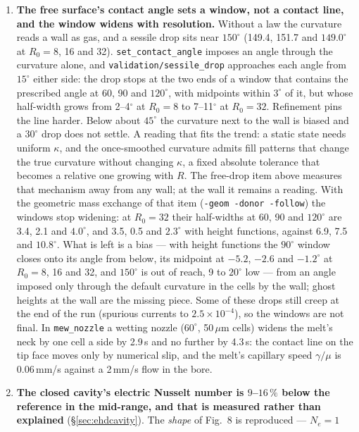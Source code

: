 \documentclass[11pt,a4paper]{article}
\newcommand{\code}[1]{\texttt{\small #1}}
\begin{document}
\begin{enumerate}[leftmargin=1.4em,itemsep=4pt]
\item \textbf{The free surface's contact angle sets a window, not a contact
  line, and the window widens with resolution.} Without a law the curvature
  reads a wall as gas, and a sessile drop sits near $150^\circ$ (149.4, 151.7
  and $149.0^\circ$ at $R_0=8$, 16 and 32). \code{set\_contact\_angle} imposes
  an angle through the curvature alone, and \code{validation/sessile\_drop}
  approaches each angle from $15^\circ$ either side: the drop stops at the two
  ends of a window that contains the prescribed angle at 60, 90 and
  $120^\circ$, with midpoints within $3^\circ$ of it, but whose half-width grows
  from 2--4$^\circ$ at $R_0=8$ to 7--11$^\circ$ at $R_0=32$. Refinement pins the
  line harder. Below about $45^\circ$ the curvature next to the wall is biased
  and a $30^\circ$ drop does not settle. A reading that fits the trend: a
  static state needs uniform $\kappa$, and the once-smoothed curvature admits
  fill patterns that change the true curvature without changing $\kappa$, a
  fixed absolute tolerance that becomes a relative one growing with $R$. The
  free-drop item above measures that mechanism away from any wall; at the wall
  it remains a reading. With the geometric mass exchange of that item
  (\code{-geom -donor -follow}) the windows stop widening: at $R_0=32$ their
  half-widths at 60, 90 and $120^\circ$ are 3.4, 2.1 and $4.0^\circ$, and 3.5,
  0.5 and $2.3^\circ$ with height functions, against 6.9, 7.5 and
  $10.8^\circ$. What is left is a bias --- with height functions the
  $90^\circ$ window closes onto its angle from below, its midpoint at
  $-5.2$, $-2.6$ and $-1.2^\circ$ at $R_0=8$, 16 and 32, and $150^\circ$ is
  out of reach, 9 to $20^\circ$ low --- from an angle imposed only through the
  default curvature in the cells by the wall; ghost heights at the wall are the
  missing piece. Some of these drops still creep at the end of the run
  (spurious currents to $2.5\times10^{-4}$), so the windows are not final.
  In \code{mew\_nozzle} a wetting nozzle ($60^\circ$, 50\,$\mu$m
  cells) widens the melt's neck by one cell a side by 2.9\,s and no further by
  4.3\,s: the contact line on the tip face moves only by numerical slip, and
  the melt's capillary speed $\gamma/\mu$ is 0.06\,mm/s against a 2\,mm/s
  flow in the bore.
\item \textbf{The closed cavity's electric Nusselt number is $9$--$16\,\%$ below
  the reference in the mid-range, and that is measured rather than explained}
  (\S\ref{sec:ehdcavity}). The \emph{shape} of Fig.~8 is reproduced --- $N_e=1$

\end{enumerate}
\end{document}
